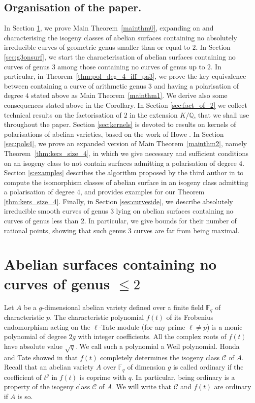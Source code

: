 \documentclass[11pt]{amsart}
\newcommand\Fq{\mathbb{F}_q}
\newcommand\Q{\mathbb{Q}}
\newcommand\cC{\mathcal{C}}
\theoremstyle{plain}
\theoremstyle{definition}
\begin{document}
\subsection*{Organisation of the paper.}
In Section \ref{sec:genus2}, we prove Main Theorem~\ref{mainthm0}, expanding on \cite{MYFE1} and characterising the isogeny classes of abelian surfaces containing no absolutely irreducible curves of geometric genus smaller than or equal to $2$.
In Section \ref{sec:g3onsurf}, we start the characterisation of abelian surfaces containing no curves of genus $3$ among those containing no curves of genus up to $2$. 
In particular, in Theorem~\ref{thm:pol_deg_4_iff_pa3}, we prove the key equivalence between containing a curve of arithmetic genus $3$ and having a polarisation of degree $4$ stated above as Main Theorem~\ref{mainthm1}.
We derive also some consequences stated above in the Corollary.
In Section \ref{sec:fact_of_2} we collect technical results on the factorisation of $2$ in the extension $K/\Q$, that we shall use throughout the paper. 
Section \ref{sec:kernels} is devoted to results on kernels of polarisations of abelian varieties, based on the work of Howe \cite{Howe95,Howe96}. 
In Section \ref{sec:pols4}, we prove an expanded version of Main Theorem~\ref{mainthm2}, namely Theorem~\ref{thm:kers_size_4}, in which we give necessary and sufficient conditions on an isogeny class to not contain surfaces admitting a polarisation of degree $4$. 
Section \ref{s:examples} describes the algorithm proposed by the third author in \cite{Mar21} to compute the isomorphism classes of abelian surface in an isogeny class admitting a polarisation of degree $4$, and provides examples for our Theorem \ref{thm:kers_size_4}. 
Finally, in Section \ref{ses:curveside}, we describe absolutely irreducible smooth curves of genus $3$ lying on abelian surfaces containing no curves of genus less than $2$. In particular, we give bounds for their number of rational points, showing that such genus $3$ curves are far from being maximal.

\section{Abelian surfaces containing no curves of genus \texorpdfstring{$\leq 2$}{<= 2}}\label{sec:genus2}
Let $A$ be a $g$-dimensional abelian variety defined over a finite field $\Fq$ of characteristic $p$.
The characteristic polynomial $f(t)$ of its Frobenius endomorphism acting on the $\ell$-Tate module (for any prime $\ell\neq p$) is a monic polynomial of degree $2g$ with integer coefficients.
All the complex roots of $f(t)$ have absolute value $\sqrt{q}$.
We call such a polynomial a Weil polynomial.
Honda and Tate showed in \cite{tate1966,honda1968,Tate1971} that $f(t)$ completely determines the isogeny class $\cC$ of $A$.
Recall that an abelian variety $A$ over $\Fq$ of dimension $g$ is called ordinary if the coefficient of $t^g$ in $f(t)$ is coprime with $q$.
In particular, being ordinary is a property of the isogeny class $\cC$ of $A$.
We will write that $\cC$ and $f(t)$ are ordinary if $A$ is so. 
\end{document}
